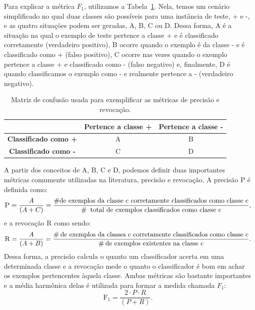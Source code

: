 Para explicar a métrica $F_1$, utilizamos a Tabela~\ref{table::confusao}. Nela, temos um cenário simplificado no qual duas classes são possíveis para uma instância de teste, + e -, e as quatro situações podem ser geradas, A, B, C ou D. Dessa forma, A é a situação na qual o exemplo de teste pertence a classe + e é classificado corretamente (verdadeiro positivo), B ocorre quando o exemplo é da classe - e é classificado como + (falso positivo), C ocorre nas vezes quando o exemplo pertence a classe + e classificado como - (falso negativo) e, finalmente, D é quando classificamos o exemplo como - e realmente pertence a - (verdadeiro negativo).

\begin{table}[ht*]
\centering
\begin{tabular}{|c|c|c|}
\toprule
       &    \textbf{Pertence a classe +} & \textbf{Pertence a classe -} \\
\midrule
    \textbf{Classificado como +}  & A & B \tabularnewline \hline
    \textbf{Classificado como -}  & C & D \tabularnewline
\bottomrule
\end{tabular}
\caption{Matriz de confusão usada para exemplificar as métricas de precisão e revocação.}
\label{table::confusao}
\end{table}

A partir dos conceitos de A, B, C e D, podemos definir duas importantes métricas comumente utilizadas na literatura, precisão e revocação. A precisão \textsc{P} é definida como:
\begin{equation}
\textsc{P} = \frac{A}{(A+C)} = \frac{\# \text{de exemplos da classe c corretamente classificados como classe c}} {\# \: \text{ total de exemplos classificados como classe c}} \\,
\end{equation}
e a revocação \textsc{R} como sendo:
\begin{equation}
\textsc{R} = \frac{A}{(A+B)} = \frac{\# \: \text{de exemplos da classes c corretamente classificados como classe c}}{\# \: \text{de exemplos existentes na classe c}}.
\end{equation}
Dessa forma, a precisão calcula o quanto um classificador acerta em uma determinada classe e a revocação mede o quanto o classificador é bom em achar os exemplos pertencentes àquela classe.
Ambas métricas são bastante importantes e a média harmônica delas é utilizada para formar a medida chamada $F_1$:
\begin{equation}
\text{F}_1 = \frac{2 \cdot P \cdot R}{(P + R)}.
\end{equation}

